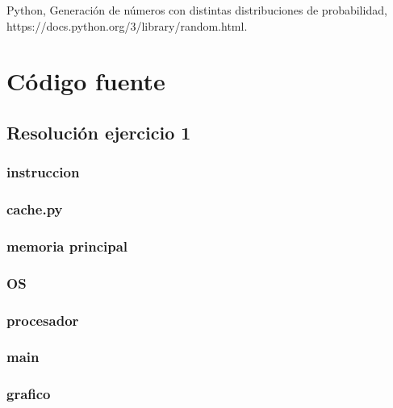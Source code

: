 \documentclass[11pt,a4paper]{article}
\begin{document}
\begin{thebibliography}{10}
	\bibitem{} Python, Generación de números con distintas distribuciones de probabilidad, https://docs.python.org/3/library/random.html.

\end{thebibliography}


\newpage
\appendix
\section{Código fuente}\label{appendix_codigo_fuente}

	\subsection{Resolución ejercicio 1}\label{ejercicio_1}
		\subsubsection{instruccion}
			
		\subsubsection{cache.py}
			
		\subsubsection{memoria principal}
			
		\subsubsection{OS}
			
		\subsubsection{procesador}
			
		\subsubsection{main}
			
		\subsubsection{grafico}
			
\end{document}
